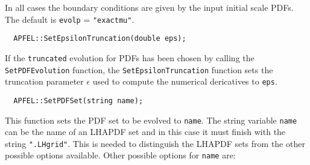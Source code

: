 \documentclass[11pt,a4paper]{article}
\begin{document}
In all cases the boundary conditions are given by the input initial
scale PDFs. The default is {\tt evolp} = {\tt "exactmu"}.
\begin{lstlisting}
  APFEL::SetEpsilonTruncation(double eps);
\end{lstlisting}
If the {\tt truncated} evolution for PDFs has been chosen by calling
the {\tt SetPDFEvolution} function, the {\tt SetEpsilonTruncation}
function sets the truncation parameter $\epsilon$ used to compute the
numerical dericatives to {\tt eps}.
\begin{lstlisting}
  APFEL::SetPDFSet(string name);
\end{lstlisting}
This function sets the PDF set to be evolved to {\tt name}. The
string variable {\tt name} can be the name of an LHAPDF set and in
this case it must finish with the string {\tt ".LHgrid"}. This is
needed to distinguish the LHAPDF sets from the other possible options
available. Other possible options for {\tt name} are:
\end{document}
